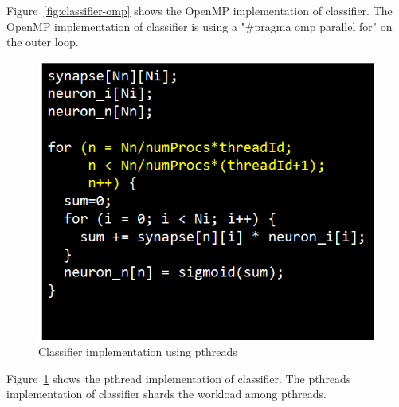 Figure~\ref{fig:classifier-omp} shows the OpenMP implementation of 
classifier. The OpenMP implementation of classifier is using a 
"#pragma omp parallel for" on the outer loop. 


\begin{figure}
  \begin{center}
    \includegraphics[width=\linewidth]{cs758-figs/classifier-pthread.png}
  \end{center}
\vspace{-0.2in}
  \caption{Classifier implementation using pthreads}
  \label{fig:classifier-pthread}
\vspace{-0.05in}
\end{figure}

Figure~\ref{fig:classifier-pthread} shows the pthread implementation of 
classifier. The pthreads implementation of classifier shards the 
workload among pthreads. 


